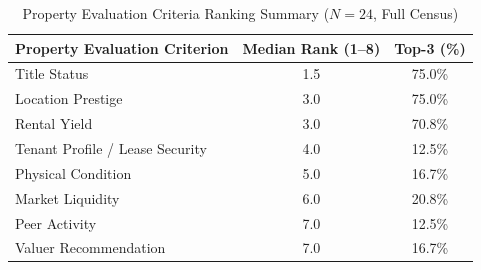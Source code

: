 \begin{table}[htbp]
\centering
\caption{Property Evaluation Criteria Ranking Summary ($N=24$, Full Census)}
\label{tab:criteria_ranks}
\begin{tabular}{lcc}
\hline
\textbf{Property Evaluation Criterion} & \textbf{Median Rank (1--8)} & \textbf{Top-3 (\%)} \\
\hline
Title Status & 1.5 & 75.0\% \\
Location Prestige & 3.0 & 75.0\% \\
Rental Yield & 3.0 & 70.8\% \\
Tenant Profile / Lease Security & 4.0 & 12.5\% \\
Physical Condition & 5.0 & 16.7\% \\
Market Liquidity & 6.0 & 20.8\% \\
Peer Activity & 7.0 & 12.5\% \\
Valuer Recommendation & 7.0 & 16.7\% \\
\hline
\end{tabular}
\end{table}
